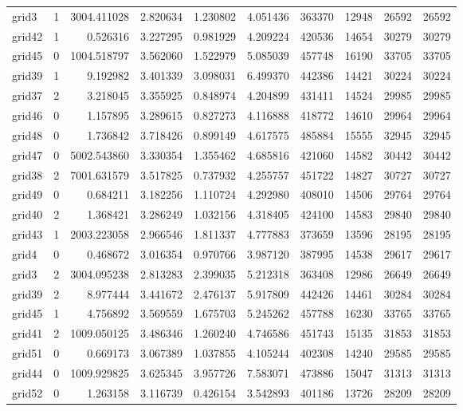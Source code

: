 \documentclass[../../../thesis.tex]{subfiles}
\begin{document}
\begin{longtable}{|l|r|r|r|r|r|r|r|r|r|}
grid3 & 1 & 3004.411028 & 2.820634 & 1.230802 & 4.051436 & 363370 & 12948 & 26592 & 26592 \\
grid42 & 1 & 0.526316 & 3.227295 & 0.981929 & 4.209224 & 420536 & 14654 & 30279 & 30279 \\
grid45 & 0 & 1004.518797 & 3.562060 & 1.522979 & 5.085039 & 457748 & 16190 & 33705 & 33705 \\
grid39 & 1 & 9.192982 & 3.401339 & 3.098031 & 6.499370 & 442386 & 14421 & 30224 & 30224 \\
grid37 & 2 & 3.218045 & 3.355925 & 0.848974 & 4.204899 & 431411 & 14524 & 29985 & 29985 \\
grid46 & 0 & 1.157895 & 3.289615 & 0.827273 & 4.116888 & 418772 & 14610 & 29964 & 29964 \\
grid48 & 0 & 1.736842 & 3.718426 & 0.899149 & 4.617575 & 485884 & 15555 & 32945 & 32945 \\
grid47 & 0 & 5002.543860 & 3.330354 & 1.355462 & 4.685816 & 421060 & 14582 & 30442 & 30442 \\
grid38 & 2 & 7001.631579 & 3.517825 & 0.737932 & 4.255757 & 451722 & 14827 & 30727 & 30727 \\
grid49 & 0 & 0.684211 & 3.182256 & 1.110724 & 4.292980 & 408010 & 14506 & 29764 & 29764 \\
grid40 & 2 & 1.368421 & 3.286249 & 1.032156 & 4.318405 & 424100 & 14583 & 29840 & 29840 \\
grid43 & 1 & 2003.223058 & 2.966546 & 1.811337 & 4.777883 & 373659 & 13596 & 28195 & 28195 \\
grid4 & 0 & 0.468672 & 3.016354 & 0.970766 & 3.987120 & 387995 & 14538 & 29617 & 29617 \\
grid3 & 2 & 3004.095238 & 2.813283 & 2.399035 & 5.212318 & 363408 & 12986 & 26649 & 26649 \\
grid39 & 2 & 8.977444 & 3.441672 & 2.476137 & 5.917809 & 442426 & 14461 & 30284 & 30284 \\
grid45 & 1 & 4.756892 & 3.569559 & 1.675703 & 5.245262 & 457788 & 16230 & 33765 & 33765 \\
grid41 & 2 & 1009.050125 & 3.486346 & 1.260240 & 4.746586 & 451743 & 15135 & 31853 & 31853 \\
grid51 & 0 & 0.669173 & 3.067389 & 1.037855 & 4.105244 & 402308 & 14240 & 29585 & 29585 \\
grid44 & 0 & 1009.929825 & 3.625345 & 3.957726 & 7.583071 & 473886 & 15047 & 31313 & 31313 \\
grid52 & 0 & 1.263158 & 3.116739 & 0.426154 & 3.542893 & 401186 & 13726 & 28209 & 28209 \\

\end{longtable}
\end{document}
